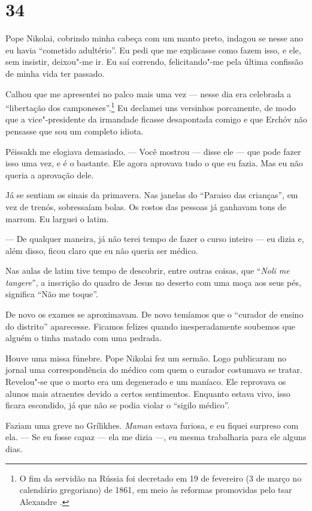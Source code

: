 \section{34}

Pope Nikolai, cobrindo minha cabeça com um manto preto, indagou se nesse
ano eu havia ``cometido adultério''. Eu pedi que me explicasse como
fazem isso, e ele, sem insistir, deixou"-me ir. Eu saí correndo,
felicitando"-me pela última confissão de minha vida ter passado.

Calhou que me apresentei no palco mais uma vez --- nesse dia era
celebrada a ``libertação dos camponeses''.\footnote{O fim da servidão na
  Rússia foi decretado em 19 de fevereiro (3 de março no calendário
  gregoriano) de 1861, em meio às reformas promovidas pelo tsar
  Alexandre \scalebox{.8}{II}.} Eu declamei uns versinhos porcamente, de modo que a
vice"-presidente da irmandade ficasse desapontada comigo e que Erchóv não
pensasse que sou um completo idiota.

Péissakh me elogiava demasiado. --- Você mostrou --- disse ele --- que
pode fazer isso uma vez, e é o bastante. Ele agora aprovava tudo o que
eu fazia. Mas eu não queria a aprovação dele.

Já se sentiam os sinais da primavera. Nas janelas do ``Paraiso das
crianças'', em vez de trenós, sobressaíam bolas. Os rostos das pessoas
já ganhavam tons de marrom. Eu larguei o latim.

--- De qualquer maneira, já não terei tempo de fazer o curso inteiro ---
eu dizia e, além disso, ficou claro que eu não queria ser médico.

Nas aulas de latim tive tempo de descobrir, entre outras coisas, que
``\emph{Noli me tangere}'', a inscrição do quadro de Jesus no deserto
com uma moça aos seus pés, significa ``Não me toque''.

De novo os exames se aproximavam. De novo temíamos que o ``curador de
ensino do distrito'' aparecesse. Ficamos felizes quando inesperadamente
soubemos que alguém o tinha matado com uma pedrada.

Houve uma missa fúnebre. Pope Nikolai fez um sermão. Logo publicaram no
jornal uma correspondência do médico com quem o curador costumava se
tratar. Revelou"-se que o morto era um degenerado e um maníaco. Ele
reprovava os alunos mais atraentes devido a certos sentimentos. Enquanto
estava vivo, isso ficara escondido, já que não se podia violar o
``sigilo médico''.

Faziam uma greve no Grílikhes. \emph{Maman} estava furiosa, e eu fiquei
surpreso com ela. --- Se eu fosse capaz --- ela me dizia ---, eu mesma
trabalharia para ele alguns dias.

